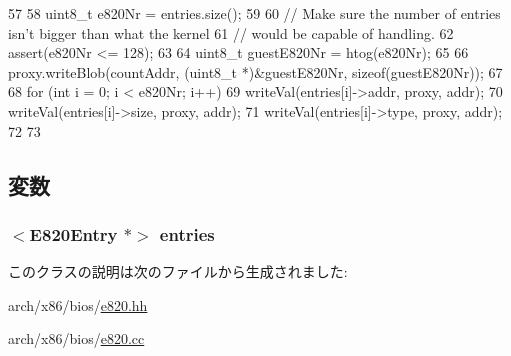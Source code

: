 \begin{DoxyCode}
57 {
58     uint8_t e820Nr = entries.size();
59 
60     // Make sure the number of entries isn't bigger than what the kernel
61     // would be capable of handling.
62     assert(e820Nr <= 128);
63 
64     uint8_t guestE820Nr = htog(e820Nr);
65 
66     proxy.writeBlob(countAddr, (uint8_t *)&guestE820Nr, sizeof(guestE820Nr));
67 
68     for (int i = 0; i < e820Nr; i++) {
69         writeVal(entries[i]->addr, proxy, addr);
70         writeVal(entries[i]->size, proxy, addr);
71         writeVal(entries[i]->type, proxy, addr);
72     }
73 }
\end{DoxyCode}


\subsection{変数}
\hypertarget{classX86ISA_1_1E820Table_a15964c933e068d7bfa598d6900a7ab4d}{
\subsubsection[{entries}]{$<${\bf E820Entry} $\ast$$>$ {\bf entries}}}
\label{classX86ISA_1_1E820Table_a15964c933e068d7bfa598d6900a7ab4d}


このクラスの説明は次のファイルから生成されました:\begin{DoxyCompactItemize}
\item 
arch/x86/bios/\hyperlink{e820_8hh}{e820.hh}\item 
arch/x86/bios/\hyperlink{e820_8cc}{e820.cc}\end{DoxyCompactItemize}
